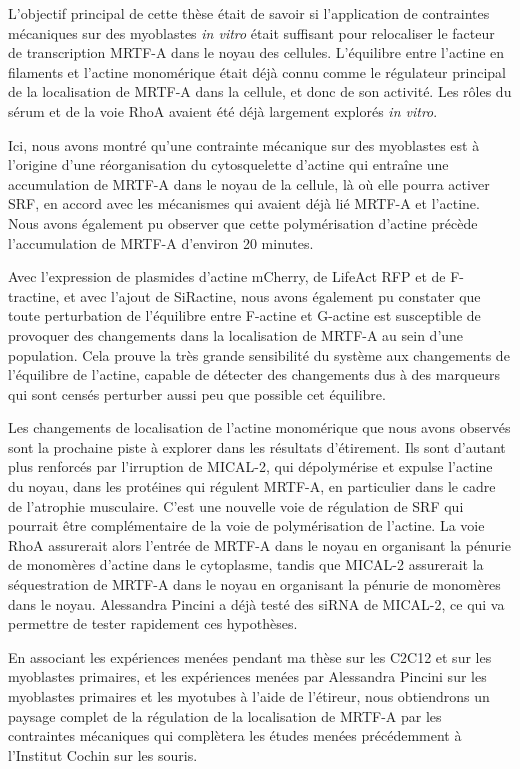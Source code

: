 \documentclass[10pt,twoside]{report}
\begin{document}
L'objectif principal de cette thèse était de savoir si l'application de contraintes mécaniques sur des myoblastes \textit{in vitro} était suffisant pour relocaliser le facteur de transcription MRTF-A dans le noyau des cellules. L'équilibre entre l'actine en filaments et l'actine monomérique était déjà connu comme le régulateur principal de la localisation de MRTF-A dans la cellule, et donc de son activité. Les rôles du sérum et de la voie RhoA avaient été déjà largement explorés \textit{in vitro}. 

Ici, nous avons montré qu'une contrainte mécanique sur des myoblastes est à l'origine d'une réorganisation du cytosquelette d'actine qui entraîne une accumulation de MRTF-A dans le noyau de la cellule, là où elle pourra activer SRF, en accord avec les mécanismes qui avaient déjà lié MRTF-A et l'actine. 
Nous avons également pu observer que cette polymérisation d'actine précède l'accumulation de MRTF-A d'environ 20 minutes. 

Avec l'expression de plasmides d'actine mCherry, de LifeAct RFP et de F-tractine, et avec l'ajout de SiRactine, nous avons également pu constater que toute perturbation de l'équilibre entre F-actine et G-actine est susceptible de provoquer des changements dans la localisation de MRTF-A au sein d'une population. Cela prouve la très grande sensibilité du système aux changements de l'équilibre de l'actine, capable de détecter des changements dus à des marqueurs qui sont censés perturber aussi peu que possible cet équilibre. 

Les changements de localisation de l'actine monomérique que nous avons observés sont la prochaine piste à explorer dans les résultats d'étirement. Ils sont d'autant plus renforcés par l'irruption de MICAL-2, qui dépolymérise et expulse l'actine du noyau, dans les protéines qui régulent MRTF-A, en particulier dans le cadre de l'atrophie musculaire. C'est une nouvelle voie de régulation de SRF qui pourrait être complémentaire de la voie de polymérisation de l'actine. La voie RhoA assurerait alors l'entrée de MRTF-A dans le noyau en organisant la pénurie de monomères d'actine dans le cytoplasme, tandis que MICAL-2 assurerait la séquestration de MRTF-A dans le noyau en organisant la pénurie de monomères dans le noyau. Alessandra Pincini a déjà testé des siRNA de MICAL-2, ce qui va permettre de tester rapidement ces hypothèses. 

En associant les expériences menées pendant ma thèse sur les C2C12 et sur les myoblastes primaires, et les expériences menées par Alessandra Pincini sur les myoblastes primaires et les myotubes à l'aide de l'étireur, nous obtiendrons un paysage complet de la régulation de la localisation de MRTF-A par les contraintes mécaniques qui complètera les études menées précédemment à l'Institut Cochin sur les souris. 
\end{document}

